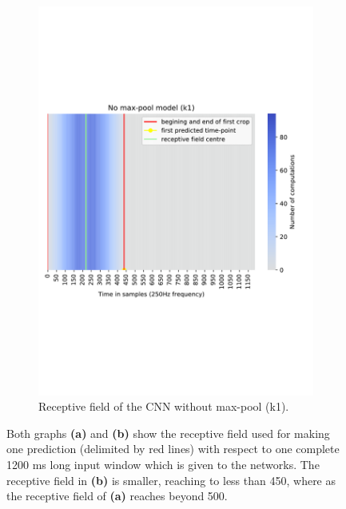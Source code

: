 \begin{figure}[!htpb]
\begin{subfigure}[b]{0.44\textwidth}
   \includegraphics[width=\linewidth]{img/ch3/k1-receptive-field}
   \caption{Receptive field of the CNN without max-pool (k1).}
\end{subfigure}
\caption[Receptive field comparison]{Both graphs \textbf{(a)} and \textbf{(b)} show the receptive field used for making one prediction (delimited by red lines) with respect to one complete 1200 ms long input window which is given to the networks. The receptive field in \textbf{(b)} is smaller, reaching to less than 450, where as the receptive field of \textbf{(a)} reaches beyond 500.} 
\end{figure}\label{fig:receptive-field-comparison}

